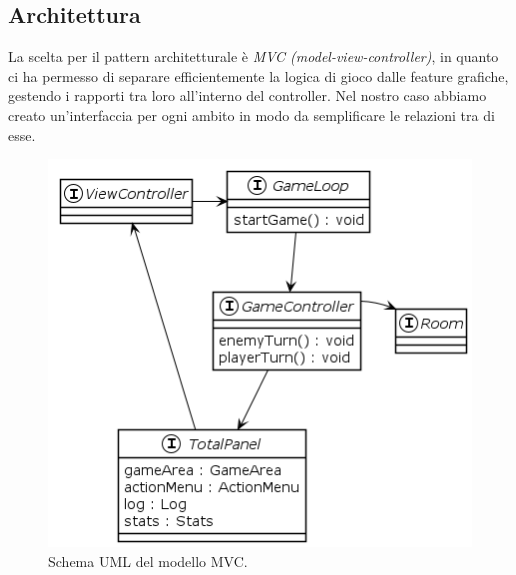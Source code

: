\documentclass[a4paper,titlepage,12pt]{article}
\begin{document}
\subsection{Architettura}
La scelta per il pattern architetturale è \textit{MVC (model-view-controller)}, in quanto ci ha permesso di separare efficientemente la logica di gioco dalle feature grafiche, gestendo i rapporti tra loro all'interno del controller. 
Nel nostro caso abbiamo creato un'interfaccia per ogni ambito in modo da semplificare le relazioni tra di esse.

\begin{figure}[H]
    \centering
    \includegraphics[scale=0.8]{img/uml/MVC.png}
    \caption{Schema UML del modello MVC.}
    \label{img:model}
\end{figure}
\end{document}
